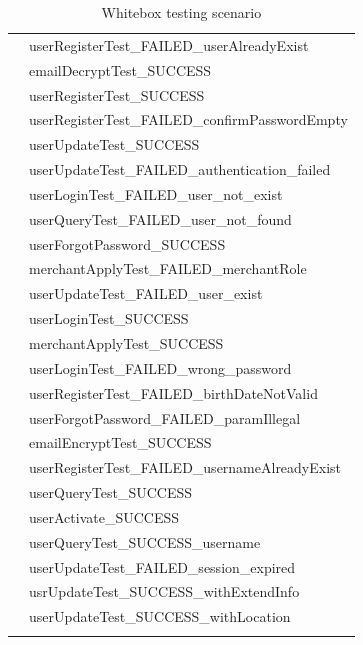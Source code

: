 \documentclass[a4paper]{article}
\begin{document}
\begin{enumerate}
\begin{longtable}[c]{|l|l|}
 & userRegisterTest\_FAILED\_userAlreadyExist \\ \cline{2-2} 
 & emailDecryptTest\_SUCCESS \\ \cline{2-2} 
 & userRegisterTest\_SUCCESS \\ \cline{2-2} 
 & userRegisterTest\_FAILED\_confirmPasswordEmpty \\ \cline{2-2} 
 & userUpdateTest\_SUCCESS \\ \cline{2-2} 
 & userUpdateTest\_FAILED\_authentication\_failed \\ \cline{2-2} 
 & userLoginTest\_FAILED\_user\_not\_exist \\ \cline{2-2} 
 & userQueryTest\_FAILED\_user\_not\_found \\ \cline{2-2} 
 & userForgotPassword\_SUCCESS \\ \cline{2-2} 
 & merchantApplyTest\_FAILED\_merchantRole \\ \cline{2-2} 
 & userUpdateTest\_FAILED\_user\_exist \\ \cline{2-2} 
 & userLoginTest\_SUCCESS \\ \cline{2-2} 
 & merchantApplyTest\_SUCCESS \\ \cline{2-2} 
 & userLoginTest\_FAILED\_wrong\_password \\ \cline{2-2} 
 & userRegisterTest\_FAILED\_birthDateNotValid \\ \cline{2-2} 
 & userForgotPassword\_FAILED\_paramIllegal \\ \cline{2-2} 
 & emailEncryptTest\_SUCCESS \\ \cline{2-2} 
 & userRegisterTest\_FAILED\_usernameAlreadyExist \\ \cline{2-2} 
 & userQueryTest\_SUCCESS \\ \cline{2-2} 
 & userActivate\_SUCCESS \\ \cline{2-2} 
 & userQueryTest\_SUCCESS\_username \\ \cline{2-2} 
 & userUpdateTest\_FAILED\_session\_expired \\ \cline{2-2} 
 & usrUpdateTest\_SUCCESS\_withExtendInfo \\ \cline{2-2} 
 & userUpdateTest\_SUCCESS\_withLocation \\ \hline
\caption{Whitebox testing scenario}
\label{tab:whiteboxTestingScenario}\\
\end{longtable}

\end{enumerate}

\newpage
\end{document}
